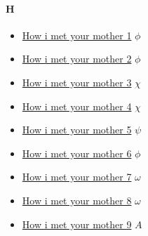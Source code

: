 	\paragraph{H} \hypertarget{SH}{}
		\begin{itemize}
		
			\item \href{https://mega.nz/#F!f9VUAJII!2hLTKNtkXD_tR5YW7aWmhg} {How i met your mother 1}  $\phi$ \\ 
			\item \href{https://mega.nz/#F!G1lGSZoK!9AJxg4Jj35gkPIa_8ylI0Q} {How i met your mother 2}  $\phi$ \\ 
			\item \href{https://mega.nz/#F!E1sQwAyC!-bkG-OFBes2WP1V0OL5V9A} {How i met your mother 3}  $\chi$ \\ 
			\item \href{https://mega.nz/#F!Yx1DyLyS!4sQoiAsS78uBHnN8BMlo1A} {How i met your mother 4}  $\chi$ \\ 
			\item \href{https://mega.nz/#F!awdVRIqJ!rQT6KbVywuIyY83E_tc55w} {How i met your mother 5}  $\psi$ \\ 
			\item \href{https://mega.nz/#F!q48kEKzQ!pCsQcpbB04wneHlO1DUKYg} {How i met your mother 6}  $\phi$ \\ 
			\item \href{https://mega.nz/#F!tEdSlB7D!wHyHsJq5gywcAcyFWKHbmg} {How i met your mother 7}  $\omega$ \\ 
			\item \href{https://mega.nz/#F!IYlQjSSS!JkZ5mgmxikROWMhfFeXQGg} {How i met your mother 8}  $\omega$ \\ 
			\item \href{https://mega.nz/#F!XlZWEBbR!TMjguf4gKqQqLWox4OF4yA} {How i met your mother 9}  $A$ \\ 
			
				
	\end{itemize}
			
